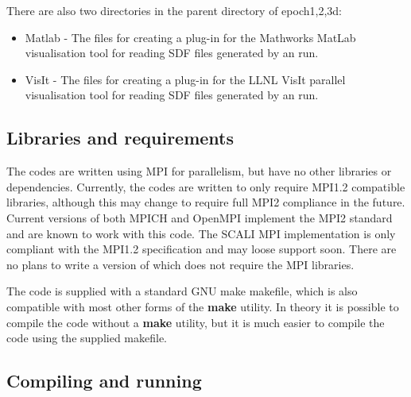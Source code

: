 \documentclass[12pt,a4paper]{article}
\newcommand{\EPOCH}{{\color{warwickdark}\fontfamily{phv}\selectfont{EPOCH}}}
\begin{document}
There are also two directories in the parent directory of epoch{1,2,3}d:

\begin{itemize}
\item Matlab - The files for creating a plug-in for the Mathworks MatLab
  visualisation tool for reading SDF files generated by an {\EPOCH} run.
\item VisIt - The files for creating a plug-in for the LLNL VisIt parallel
  visualisation tool for reading SDF files generated by an {\EPOCH} run.
\end{itemize}

\subsection{Libraries and requirements}
The {\EPOCH} codes are written using MPI for parallelism, but have no other
libraries or dependencies. Currently, the codes are written to only require
MPI1.2 compatible libraries, although this may change to require full MPI2
compliance in the future. Current versions of both MPICH and OpenMPI implement
the MPI2 standard and are known to work with this code. The SCALI MPI
implementation is only compliant with the MPI1.2 specification and may loose
support soon.
There are no plans to write a version of {\EPOCH} which does not require
the MPI libraries.

The code is supplied with a standard GNU make makefile, which is also
compatible with most other forms of the {\bf make} utility. In theory it is
possible to compile the code without a {\bf make} utility, but it is much
easier to compile the code using the supplied makefile.

\subsection{Compiling and running {\EPOCH}}
\end{document}
